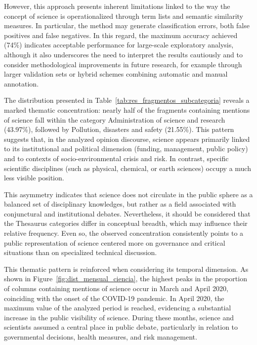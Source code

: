 \documentclass[11pt,a4paper]{article}
\begin{document}
However, this approach presents inherent limitations linked to the way the concept of science is operationalized through term lists and semantic similarity measures. In particular, the method may generate classification errors, both false positives and false negatives. In this regard, the maximum accuracy achieved (74\%) indicates acceptable performance for large-scale exploratory analysis, although it also underscores the need to interpret the results cautiously and to consider methodological improvements in future research, for example through larger validation sets or hybrid schemes combining automatic and manual annotation.


The distribution presented in Table~\ref{tab:res_fragmentos_subcategoria} reveals a marked thematic concentration: nearly half of the fragments containing mentions of science fall within the category Administration of science and research (43.97\%), followed by Pollution, disasters and safety (21.55\%). This pattern suggests that, in the analyzed opinion discourse, science appears primarily linked to its institutional and political dimension (funding, management, public policy) and to contexts of socio-environmental crisis and risk. In contrast, specific scientific disciplines (such as physical, chemical, or earth sciences) occupy a much less visible position.


This asymmetry indicates that science does not circulate in the public sphere as a balanced set of disciplinary knowledges, but rather as a field associated with conjunctural and institutional debates. Nevertheless, it should be considered that the Thesaurus categories differ in conceptual breadth, which may influence their relative frequency. Even so, the observed concentration consistently points to a public representation of science centered more on governance and critical situations than on specialized technical discussion.

This thematic pattern is reinforced when considering its temporal dimension. As shown in Figure~\ref{fig:dist_mensual_ciencia}, the highest peaks in the proportion of columns containing mentions of science occur in March and April 2020, coinciding with the onset of the COVID-19 pandemic. In April 2020, the maximum value of the analyzed period is reached, evidencing a substantial increase in the public visibility of science. During these months, science and scientists assumed a central place in public debate, particularly in relation to governmental decisions, health measures, and risk management.
\end{document}
